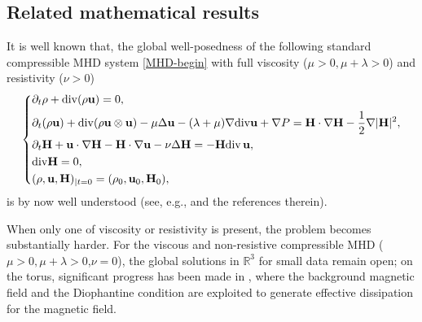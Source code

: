 \documentclass[12pt, reqno]{amsart}
\numberwithin{equation}{section}
\numberwithin{equation}{section}
\def\div{ \hbox{\rm div}\,  }
\numberwithin{equation}{section}
\numberwithin{equation}{section}
\theoremstyle{remark}
\newcommand{\Dv}{{\rm div}}
\def\div{ \hbox{\rm div}\,  }
\def\u{ \mathbf{u} }
\def\H{ \mathbf{H} }
\begin{document}
\subsection{Related mathematical results}
It is well known that,
the global well-posedness of the  following standard compressible MHD system
\eqref{MHD-begin} with full viscosity ($\mu>0, \mu+\lambda>0$) and resistivity
($\nu>0$)
\begin{eqnarray}\label{MHD-begin}
	\left\{\begin{aligned}
		&\partial_t \rho + {\mathrm{div}} (\rho \mathbf{u}) =0,  \\
		&\partial_{t}(\rho \u)+\Dv (\rho \u\otimes \u)-\mu\Delta \mathbf{u} - (\lambda+\mu) \nabla {\mathrm{div}} \mathbf{u}+\nabla P=\H\cdot \nabla \H-\frac{1}{2}\nabla|\mathbf{H}|^2,\\
		&\partial_t \mathbf{H}+\mathbf{u}\cdot\nabla\mathbf{H}-\mathbf{H}\cdot\nabla\mathbf{u}-\nu\Delta \mathbf{H}
		=-\mathbf{H}\div\mathbf{u},\\
		&{\mathrm{div}} \mathbf{H} =0,\\
		&(\rho,\u,\H)_{|t=0}=(\rho_0,\u_0,\H_0),
	\end{aligned}\right.
\end{eqnarray}
is by now well understood (see, e.g.,
\cite{DF,Gao-Wu-Xu,Hu-Wang1,Hu-Wang2,Kawashima,KawashimaS,K-L,L-X-Z,L-M-X,L-H,L-H1,Suen,SuenA,VH} and the references therein).

\medskip
When only one of viscosity or resistivity is present, the problem becomes
substantially harder.  For the viscous and non-resistive compressible MHD
($\mu>0, \mu+\lambda>0$,$\nu=0$), the global solutions in $\mathbb{R}^3$ for small
data remain open; on the torus, significant progress has been made in
\cite{Dong-Wu-Zhai,Wu-Wu,Wu-Zhai,Wu-Zhu,Li-Xu-Zhai,Jiu-Liu-Xie}, where
the background magnetic field and the Diophantine condition are
exploited to generate effective dissipation for the magnetic field.
\end{document}
